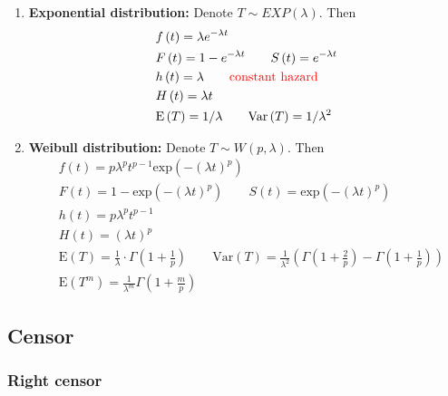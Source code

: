 \documentclass[a4paper,12pt]{article}
\begin{document}
\begin{enumerate}
\item \textbf{Exponential distribution:} Denote $T\sim EXP(\lambda)$. Then
  \[
    \begin{aligned}
      & f\left(t\right) = \lambda e^{-\lambda t}    \\
      & F\left(t\right) = 1 - e^{-\lambda t}
      \quad\quad S\left(t\right) = e^{-\lambda t}    \\
      & h\left(t\right) = \lambda
      \quad\quad{\color{red}\text{constant hazard}}\\
      & H\left(t\right) = \lambda t    \\
      & \mathrm{E}\left(T\right) = 1 / \lambda
      \quad\quad \mathrm{Var}\left(T\right) = 1 / \lambda ^ 2
    \end{aligned}
  \]
  
\item \textbf{Weibull distribution:} Denote $T\sim W\left(p, \lambda\right)$. Then
  \[
    \begin{aligned}
      & f\left(t\right) = p\lambda^pt^{p - 1}\mathrm{exp}\left(-\left(\lambda t\right)^p\right)    \\
      & F\left(t\right) = 1 - \mathrm{exp}\left(-\left(\lambda t\right)^p\right)
      \quad\quad S\left(t\right) = \mathrm{exp}\left(-\left(\lambda t\right)^p\right)    \\
      & h\left(t\right) = p\lambda^pt^{p - 1}    \\
      & H\left(t\right) = \left(\lambda t\right)^p    \\
      & \mathrm{E}\left(T\right) = \frac{1}{\lambda} \cdot \Gamma\left(1 + \frac{1}{p}\right)
      \quad\quad \mathrm{Var}\left(T\right) = \frac{1}{\lambda^2}\left(
        \Gamma\left(1 + \frac{2}{p}\right)
        - \Gamma\left(1 + \frac{1}{p}\right)
      \right)    \\
      & \mathrm{E}\left(T^m\right) = \frac{1}{\lambda^m}\Gamma\left(1 + \frac{m}{p}\right)
    \end{aligned}
  \]
\end{enumerate}

\subsection{Censor}
\label{sec:censor}

\subsubsection{Right censor}
\label{sec:right-censor}
\end{document}

